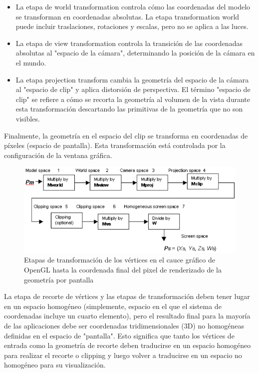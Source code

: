 \documentclass[a4paper, 17pt]{book}
\begin{document}
\begin{itemize}
  \item La etapa de world transformation controla cómo las coordenadas del modelo se transforman en coordenadas absolutas.
  La etapa transformation world puede incluir traslaciones, rotaciones y escalas, pero no se aplica a las luces.
  
  \item La etapa de view transformation controla la transición de las coordenadas absolutas al "espacio de la cámara",
  determinando la posición de la cámara en el mundo.

  \item La etapa projection transform cambia la geometría del espacio de la cámara al "espacio de clip" y aplica
  distorsión de perspectiva. El término "espacio de clip" se refiere a cómo se recorta la geometría al volumen
  de la vista durante esta transformación descartando las primitivas de la geometría que no son visibles.
  
\end{itemize}

Finalmente, la geometría en el espacio del clip se transforma en coordenadas de píxeles (espacio de pantalla).
Esta transformación está controlada por la configuración de la ventana gráfica.

\begin{figure}[H]
    \centering
    \includegraphics[scale=0.40, keepaspectratio]{img/d3dxfrm61.png}
    \caption{Etapas de transformación de los vértices en el cauce gráfico de OpenGL hasta la coordenada final
    del pixel de renderizado de la geometría por pantalla}
    \label{figura:khronos}
\end{figure}

La etapa de recorte de vértices y las etapas de transformación deben tener lugar en un espacio homogéneo (simplemente,
espacio en el que el sistema de coordenadas incluye un cuarto elemento), pero el resultado final para la mayoría de
las aplicaciones debe ser coordenadas tridimensionales (3D) no homogéneas definidas en el espacio de "pantalla".
Esto significa que tanto los vértices de entrada como la geometría de recorte deben traducirse en un espacio homogéneo
para realizar el recorte o clipping y luego volver a traducirse en un espacio no homogéneo para su visualización.
\end{document}

